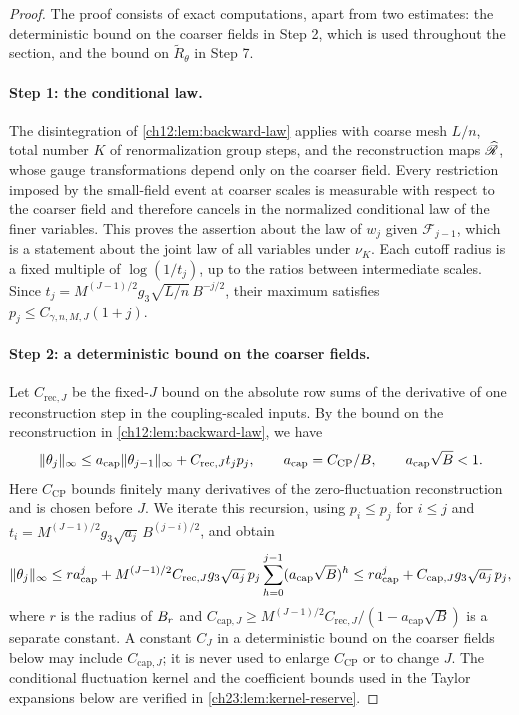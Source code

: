\begin{proof}
The proof consists of exact computations, apart from two estimates: the deterministic bound on the coarser fields in Step 2, which is used throughout the section, and the bound on $\widetilde R_\theta$ in Step 7.

\paragraph{Step 1: the conditional law.}
The disintegration of \cref{ch12:lem:backward-law} applies with coarse mesh $L/n$, total number $K$ of renormalization group steps, and the reconstruction maps $\widehat{\mathscr R}$, whose gauge transformations depend only on the coarser field. Every restriction imposed by the small-field event at coarser scales is measurable with respect to the coarser field and therefore cancels in the normalized conditional law of the finer variables. This proves the assertion about the law of $w_j$ given $\mathcal F_{j-1}$, which is a statement about the joint law of all variables under $\nu_K$. Each cutoff radius is a fixed multiple of $\log(1/t_j)$, up to the ratios between intermediate scales. Since $t_j=M^{(J-1)/2}g_3\sqrt{L/n}\,B^{-j/2}$, their maximum satisfies $p_j\le C_{\gamma,n,M,J}(1+j)$.

\paragraph{Step 2: a deterministic bound on the coarser fields.}
Let $C_{\mathrm{rec},J}$ be the fixed-$J$ bound on the absolute row sums of the derivative of one reconstruction step in the coupling-scaled inputs. By the bound on the reconstruction in \cref{ch12:lem:backward-law}, we have
\[
 \lVert \theta_j\rVert_\infty\le a_{\mathrm{cap}}\lVert \theta_{j-1}\rVert_\infty+C_{\mathrm{rec},J}t_jp_j,
 \qquad a_{\mathrm{cap}}=C_{\mathrm{CP}}/B,\qquad a_{\mathrm{cap}}\sqrt B<1.
\]
Here $C_{\mathrm{CP}}$ bounds finitely many derivatives of the zero-fluctuation reconstruction and is chosen before $J$. We iterate this recursion, using $p_i\le p_j$ for $i\le j$ and $t_i=M^{(J-1)/2}g_3\sqrt{a_j}\,B^{(j-i)/2}$, and obtain
\begin{equation}\label{ch23:eq:coarser-field-bound}
 \lVert \theta_j\rVert_\infty\le ra_{\mathrm{cap}}^j
 +M^{(J-1)/2}C_{\mathrm{rec},J}g_3\sqrt{a_j}\,p_j\sum_{h=0}^{j-1}(a_{\mathrm{cap}}\sqrt B)^h
 \le ra_{\mathrm{cap}}^j+C_{\mathrm{cap},J}g_3\sqrt{a_j}\,p_j,
\end{equation}
where $r$ is the radius of $B_{r}$ and $C_{\mathrm{cap},J}\ge M^{(J-1)/2}C_{\mathrm{rec},J}/(1-a_{\mathrm{cap}}\sqrt B)$ is a separate constant. A constant $C_J$ in a deterministic bound on the coarser fields below may include $C_{\mathrm{cap},J}$; it is never used to enlarge $C_{\mathrm{CP}}$ or to change $J$. The conditional fluctuation kernel and the coefficient bounds used in the Taylor expansions below are verified in \cref{ch23:lem:kernel-reserve}.


\end{proof}
